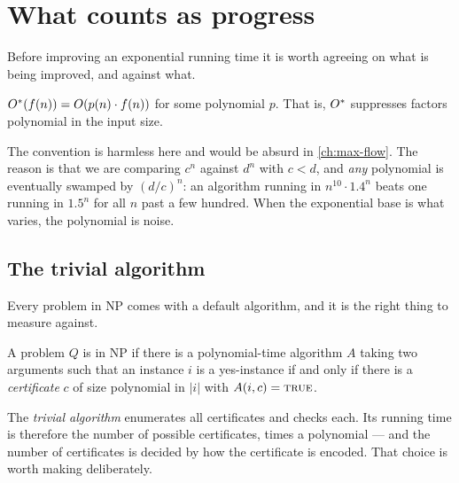 \section{What counts as progress}
\label{sec:exact-progress}

Before improving an exponential running time it is worth agreeing on what is
being improved, and against what.

\begin{definition}\label{def:ostar}
$O^{*}(f(n)) = O\!\left(p(n) \cdot f(n)\right)$ for some polynomial $p$. That is,
$O^{*}$ suppresses factors polynomial in the input size.
\end{definition}

The convention is harmless here and would be absurd in \cref{ch:max-flow}. The
reason is that we are comparing $c^n$ against $d^n$ with $c < d$, and
\emph{any} polynomial is eventually swamped by $(d/c)^n$: an algorithm running
in $n^{10} \cdot 1.4^n$ beats one running in $1.5^n$ for all $n$ past a few
hundred. When the exponential base is what varies, the polynomial is noise.

\subsection{The trivial algorithm}

Every problem in \textrm{NP} comes with a default algorithm, and it is the
right thing to measure against.

\begin{definition}[Certificate]\label{def:certificate}
A problem $Q$ is in \textrm{NP} if there is a polynomial-time algorithm $A$
taking two arguments such that an instance $i$ is a yes-instance if and only if
there is a \emph{certificate} $c$ of size polynomial in $|i|$ with
$A(i,c) = \textsc{true}$.
\end{definition}

The \emph{trivial algorithm} enumerates all certificates and checks each. Its
running time is therefore the number of possible certificates, times a
polynomial --- and the number of certificates is decided by how the certificate
is encoded. That choice is worth making deliberately.

